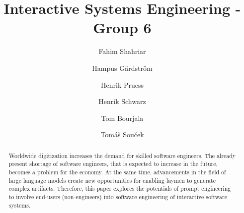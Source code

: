 \documentclass[acsmall,screen]{acmart}
\begin{document}
\title{Interactive Systems Engineering - Group 6}

\author{Fahim Shahriar}

\author{Hampus Gärdström}

\author{Henrik Pruess}

\author{Henrik Schwarz}

\author{Tom Bourjala}

\author{Tomáš Souček}

\renewcommand{\shortauthors}{Shahriar, et al.}

\begin{abstract}
  Worldwide digitization increases the demand for skilled software engineers. The already present shortage of software engineers, that is expected to increase in the future, becomes a problem for the economy. At the same time, advancements in the field of large language models create new opportunities for enabling laymen to generate complex artifacts. Therefore, this paper explores the potentials of prompt engineering to involve end-users (non-engineers) into software engineering of interactive software systems.
\end{abstract}
\end{document}
